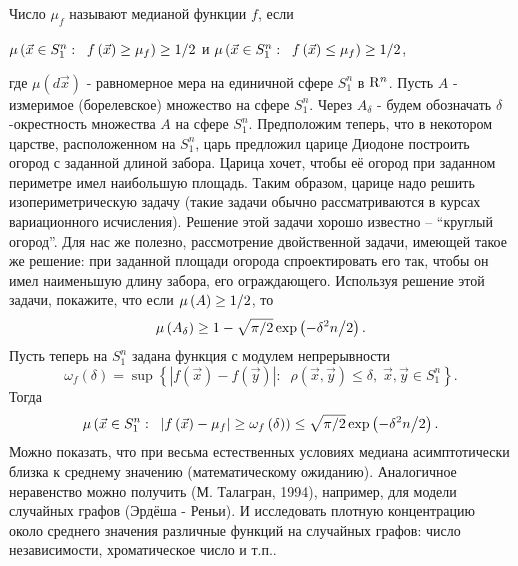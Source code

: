\begin{problem}
Число $\mu _f $ называют медианой функции $f$, если

$\mu \left( {\vec {x}\in S_1^n :\;\;f\left( {\vec {x}} \right)\ge \mu _f } 
\right)\ge 1 \mathord{\left/ {\vphantom {1 2}} \right. 
\kern-\nulldelimiterspace} 2$ и $\mu \left( {\vec {x}\in S_1^n :\;\;f\left( 
{\vec {x}} \right)\le \mu _f } \right)\ge 1 \mathord{\left/ {\vphantom {1 
2}} \right. \kern-\nulldelimiterspace} 2$,

где $\mu \left( {d\vec {x}} \right)$ - равномерное мера на единичной сфере 
$S_1^n $ в ${\rm R}^n$. Пусть $A$ - измеримое (борелевское) множество на 
сфере $S_1^n $. Через $A_\delta $ - будем обозначать $\delta $-окрестность 
множества $A$ на сфере $S_1^n $. Предположим теперь, что в некотором 
царстве, расположенном на $S_1^n $, царь предложил царице Диодоне построить 
огород с заданной длиной забора. Царица хочет, чтобы её огород при заданном 
периметре имел наибольшую площадь. Таким образом, царице надо решить 
изопериметрическую задачу (такие задачи обычно рассматриваются в курсах 
вариационного исчисления). Решение этой задачи хорошо известно -- ``круглый 
огород''. Для нас же полезно, рассмотрение двойственной задачи, имеющей 
такое же решение: при заданной площади огорода спроектировать его так, чтобы 
он имел наименьшую длину забора, его ограждающего. Используя решение этой 
задачи, покажите, что если $\mu \left( A \right)\ge 1 \mathord{\left/ 
{\vphantom {1 2}} \right. \kern-\nulldelimiterspace} 2$, то
\[
\mu \left( {A_\delta } \right)\ge 1-\sqrt {\pi \mathord{\left/ {\vphantom 
{\pi 2}} \right. \kern-\nulldelimiterspace} 2} \exp \left( {-{\delta ^2n} 
\mathord{\left/ {\vphantom {{\delta ^2n} 2}} \right. 
\kern-\nulldelimiterspace} 2} \right).
\]
Пусть теперь на $S_1^n $ задана функция с модулем непрерывности
\[
\omega _f \left( \delta \right)=\sup \left\{ {\left| {f\left( {\vec {x}} 
\right)-f\left( {\vec {y}} \right)} \right|:\;\;\rho \left( {\vec {x},\vec 
{y}} \right)\le \delta ,\;\vec {x},\vec {y}\in S_1^n } \right\}.
\]
Тогда
\[
\mu \left( {\vec {x}\in S_1^n :\;\;\left| {f\left( {\vec {x}} \right)-\mu _f 
} \right|\ge \omega _f \left( \delta \right)} \right)\le \sqrt {\pi 
\mathord{\left/ {\vphantom {\pi 2}} \right. \kern-\nulldelimiterspace} 2} 
\exp \left( {-{\delta ^2n} \mathord{\left/ {\vphantom {{\delta ^2n} 2}} 
\right. \kern-\nulldelimiterspace} 2} \right).
\]
Можно показать, что при весьма естественных условиях медиана асимптотически 
близка к среднему значению (математическому ожиданию). Аналогичное 
неравенство можно получить (М. Талагран, 1994), например, для модели 
случайных графов (Эрдёша - Реньи). И исследовать плотную концентрацию около 
среднего значения различные функций на случайных графов: число 
независимости, хроматическое число и т.п..
\end{problem}

